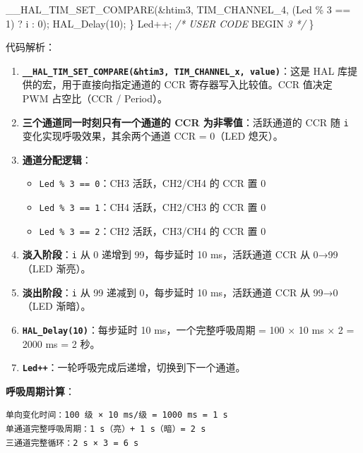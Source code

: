 \documentclass[
  chinese,
  UTF8,
  oneside,
  openany]{ctexbook}
\newenvironment{Shaded}{}{}
\newcommand{\CommentTok}[1]{\textcolor[rgb]{0.38,0.63,0.69}{\textit{#1}}}
\newcommand{\DecValTok}[1]{\textcolor[rgb]{0.25,0.63,0.44}{#1}}
\newcommand{\NormalTok}[1]{#1}
\newcommand{\OperatorTok}[1]{\textcolor[rgb]{0.40,0.40,0.40}{#1}}
\newcommand{\RegionMarkerTok}[1]{#1}
\providecommand{\tightlist}{%
  \setlength{\itemsep}{0pt}\setlength{\parskip}{0pt}}
\begin{document}
\begin{Shaded}
\begin{Highlighting}[]
\NormalTok{        \_\_HAL\_TIM\_SET\_COMPARE}\OperatorTok{(\&}\NormalTok{htim3}\OperatorTok{,}\NormalTok{ TIM\_CHANNEL\_4}\OperatorTok{,} \OperatorTok{(}\NormalTok{Led }\OperatorTok{\%} \DecValTok{3} \OperatorTok{==} \DecValTok{1}\OperatorTok{)} \OperatorTok{?}\NormalTok{ i }\OperatorTok{:} \DecValTok{0}\OperatorTok{);}
\NormalTok{        HAL\_Delay}\OperatorTok{(}\DecValTok{10}\OperatorTok{);}
    \OperatorTok{\}}
\NormalTok{    Led}\OperatorTok{++;}
    \CommentTok{/* USER CODE }\RegionMarkerTok{BEGIN}\CommentTok{ 3 */}
\OperatorTok{\}}
\end{Highlighting}
\end{Shaded}

代码解析：

\begin{enumerate}
\def\labelenumi{\arabic{enumi}.}
\tightlist
\item
  \textbf{\texttt{\_\_HAL\_TIM\_SET\_COMPARE(\&htim3,\ TIM\_CHANNEL\_x,\ value)}}：这是
  HAL 库提供的宏，用于直接向指定通道的 CCR 寄存器写入比较值。CCR 值决定
  PWM 占空比（CCR / Period）。
\item
  \textbf{三个通道同一时刻只有一个通道的 CCR 为非零值}：活跃通道的 CCR
  随 \texttt{i} 变化实现呼吸效果，其余两个通道 CCR = 0（LED 熄灭）。
\item
  \textbf{通道分配逻辑}：

  \begin{itemize}
  \tightlist
  \item
    \texttt{Led\ \%\ 3\ ==\ 0}：CH3 活跃，CH2/CH4 的 CCR 置 0
  \item
    \texttt{Led\ \%\ 3\ ==\ 1}：CH4 活跃，CH2/CH3 的 CCR 置 0
  \item
    \texttt{Led\ \%\ 3\ ==\ 2}：CH2 活跃，CH3/CH4 的 CCR 置 0
  \end{itemize}
\item
  \textbf{淡入阶段}：\texttt{i} 从 0 递增到 99，每步延时 10 ms，活跃通道
  CCR 从 0→99（LED 渐亮）。
\item
  \textbf{淡出阶段}：\texttt{i} 从 99 递减到 0，每步延时 10 ms，活跃通道
  CCR 从 99→0（LED 渐暗）。
\item
  \textbf{\texttt{HAL\_Delay(10)}}：每步延时 10 ms，一个完整呼吸周期 =
  100 × 10 ms × 2 = 2000 ms = 2 秒。
\item
  \textbf{\texttt{Led++}}：一轮呼吸完成后递增，切换到下一个通道。
\end{enumerate}

\textbf{呼吸周期计算}：

\begin{verbatim}
单向变化时间：100 级 × 10 ms/级 = 1000 ms = 1 s
单通道完整呼吸周期：1 s（亮）+ 1 s（暗）= 2 s
三通道完整循环：2 s × 3 = 6 s
\end{verbatim}
\end{document}
